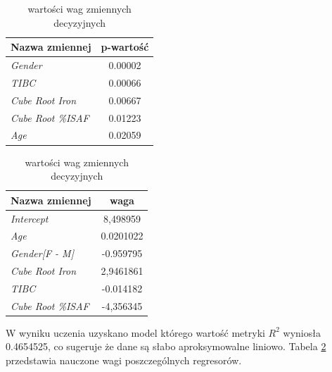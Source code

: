 \begin{table}[!ht]
	\begin{minipage}{0.48\textwidth}
		\centering
		\begin{tabular}{l|c}
			Nazwa zmiennej & p-wartość \\
			\hline
			\textit{Gender} & 0.00002 \\
			\textit{TIBC} & 0.00066 \\
			\textit{Cube Root Iron} & 0.00667 \\
			\textit{Cube Root \%ISAF} & 0.01223 \\
			\textit{Age} & 0.02059
		\end{tabular}
		\caption{Wybrane zmienne decyzyjne i ich p-wartości}
		\label{pvalue}
	\end{minipage}%
	\hspace{0.04\textwidth}
	\begin{minipage}{0.48\textwidth}
		\centering
		\begin{tabular}{l|c}
			Nazwa zmiennej & waga \\
			\hline
			\textit{Intercept} & 8,498959 \\
			\textit{Age} & 0.0201022 \\
			\textit{Gender[F - M]} & -0.959795 \\
			\textit{Cube Root Iron} & 2,9461861 \\
			\textit{TIBC} & -0.014182 \\
			\textit{Cube Root \%ISAF} & -4,356345
		\end{tabular}
		\caption{wartości wag zmiennych decyzyjnych}
		\label{weights}		
	\end{minipage}
\end{table}

W wyniku uczenia uzyskano model którego wartość metryki \textit{$R^2$} wyniosła 0.4654525, co sugeruje że dane są słabo aproksymowalne liniowo. Tabela \ref{weights} przedstawia nauczone wagi poszczególnych regresorów.